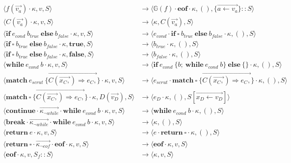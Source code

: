 \documentclass[a4paper,11pt]{article}
\begin{document}
\begin{align*}
\langle f(\overrightarrow{v_a}) \cdot \kappa, v, S\rangle &\rightarrow \langle \mathbb{G}(f) \cdot \mathbf{eof} \cdot \kappa, (), \{\overrightarrow{a \leftarrow v_a}\} :: S\rangle\\
\langle C(\overrightarrow{v_a}) \cdot \kappa, v, S\rangle &\rightarrow \langle \kappa, C(\overrightarrow{v_a}), S\rangle\\
\langle \mathbf{if}\ e_{cond}\ b_{true}\ \mathbf{else}\ b_{false} \cdot  \kappa, v, S\rangle &\rightarrow \langle e_{cond} \cdot \mathbf{if}\ \square\ b_{true}\ \mathbf{else}\ b_{false} \cdot \kappa, (), S\rangle\\
\langle \mathbf{if}\ \square\ b_{true}\ \mathbf{else}\ b_{false} \cdot  \kappa, \mathbf{true}, S\rangle &\rightarrow \langle b_{true} \cdot \kappa, (), S\rangle\\
\langle \mathbf{if}\ \square\ b_{true}\ \mathbf{else}\ b_{false} \cdot  \kappa, \mathbf{false}, S\rangle &\rightarrow \langle b_{false} \cdot \kappa, (), S\rangle\\
\langle \mathbf{while}\ e_{cond}\ b \cdot \kappa, v, S\rangle &\rightarrow \langle \mathbf{if}\ e_{cond}\ \{ b;\ \mathbf{while}\ e_{cond}\ b \}\  \mathbf{else}\ \{\} \cdot \kappa, (), S\rangle\\
\langle \mathbf{match}\ e_{scrut}\ \{ \overrightarrow{C(\overrightarrow{x_C,}) \Rightarrow e_C,} \} \cdot \kappa, v, S\rangle &\rightarrow \langle e_{scrut} \cdot \mathbf{match}\ \square\ \{ \overrightarrow{C(\overrightarrow{x_C,}) \Rightarrow e_C,} \} \cdot \kappa, (), S\rangle\\
\langle \mathbf{match}\ \square\ \{ \overrightarrow{C(\overrightarrow{x_C,}) \Rightarrow e_C,} \} \cdot \kappa, D(\overrightarrow{v_D}), S\rangle &\rightarrow \langle e_D \cdot \kappa, (), S[\overrightarrow{x_D \leftarrow v_D}]\rangle\\
\langle \mathbf{continue} \cdot \overrightarrow{\kappa_{\neg while}} \cdot \textbf{while}\ e_{cond}\ b \cdot \kappa, v, S\rangle &\rightarrow \langle \textbf{while}\ e_{cond}\ b \cdot \kappa, (), S\rangle\\
\langle \mathbf{break} \cdot \overrightarrow{\kappa_{\neg while}} \cdot \textbf{while}\ e_{cond}\ b \cdot \kappa, v, S\rangle &\rightarrow \langle \kappa, (), S\rangle\\
\langle \mathbf{return}\ e \cdot \kappa, v, S\rangle &\rightarrow \langle e \cdot \mathbf{return}\ \square \cdot \kappa, (), S\rangle\\
\langle \mathbf{return}\ \square \cdot \overrightarrow{\kappa_{\neg eof}} \cdot \textbf{eof} \cdot \kappa, v, S\rangle &\rightarrow \langle \textbf{eof} \cdot \kappa, v, S\rangle\\
\langle \textbf{eof} \cdot \kappa, v, S_f :: S\rangle &\rightarrow \langle \kappa, v, S\rangle\\
\end{align*}
\end{document}
